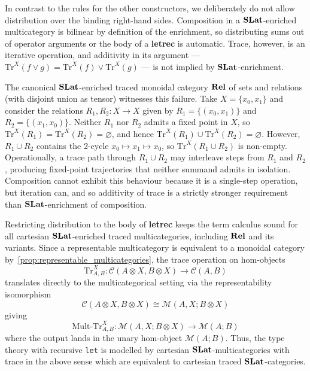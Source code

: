 \begin{example}
In contrast to the rules for the other constructors, we deliberately do not allow distribution over the binding right-hand sides.
Composition in a $\mathbf{SLat}$-enriched multicategory is bilinear by definition of the enrichment, so distributing sums out of operator arguments or the body of a \textbf{letrec} is automatic.
Trace, however, is an iterative operation, and additivity in its argument --- $\text{Tr}^X(f \vee g) = \text{Tr}^X(f) \vee \text{Tr}^X(g)$ --- is not implied by $\mathbf{SLat}$-enrichment.

The canonical $\mathbf{SLat}$-enriched traced monoidal category $\mathbf{Rel}$ of sets and relations (with disjoint union as tensor) witnesses this failure.
Take $X = \{x_0, x_1\}$ and consider the relations $R_1, R_2 : X \to X$ given by $R_1 = \{(x_0, x_1)\}$ and $R_2 = \{(x_1, x_0)\}$.
Neither $R_1$ nor $R_2$ admits a fixed point in $X$, so $\text{Tr}^X(R_1) = \text{Tr}^X(R_2) = \varnothing$, and hence $\text{Tr}^X(R_1) \cup \text{Tr}^X(R_2) = \varnothing$.
However, $R_1 \cup R_2$ contains the 2-cycle $x_0 \mapsto x_1 \mapsto x_0$, so $\text{Tr}^X(R_1 \cup R_2)$ is non-empty.
Operationally, a trace path through $R_1 \cup R_2$ may interleave steps from $R_1$ and $R_2$, producing fixed-point trajectories that neither summand admits in isolation.
Composition cannot exhibit this behaviour because it is a single-step operation, but iteration can, and so additivity of trace is a strictly stronger requirement than $\mathbf{SLat}$-enrichment of composition.

Restricting distribution to the body of \textbf{letrec} keeps the term calculus sound for all cartesian $\mathbf{SLat}$-enriched traced multicategories, including $\mathbf{Rel}$ and its variants.
Since a representable multicategory is equivalent to a monoidal category by~\autoref{prop:representable_multicategories}, the trace operation on hom-objects
\[
\text{Tr}_{A,B}^X : \mathcal{C}(A \otimes X, B \otimes X) \to \mathcal{C}(A, B)
\]
translates directly to the multicategorical setting via the representability isomorphism
\[
\mathcal{C}(A \otimes X, B \otimes X) \cong \mathcal{M}(A, X; B \otimes X)
\]
giving
\[
\text{Mult-Tr}_{A,B}^X : \mathcal{M}(A, X; B \otimes X) \to \mathcal{M}(A; B)
\]
where the output lands in the unary hom-object $\mathcal{M}(A; B)$.
Thus, the type theory with recursive \texttt{let} is modelled by cartesian $\mathbf{SLat}$-multicategories with trace in the above sense which are equivalent to cartesian traced $\mathbf{SLat}$-categories.


\end{example}
